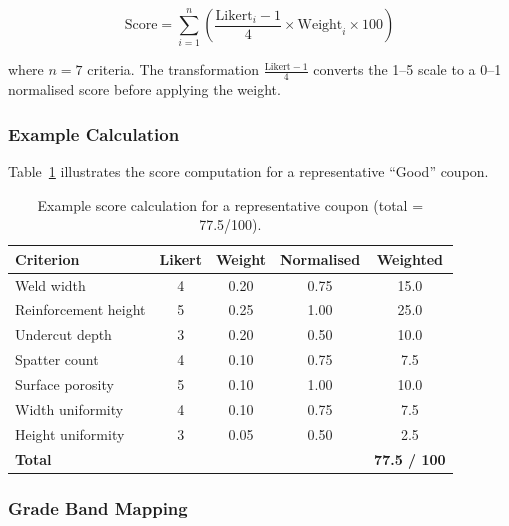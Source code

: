 \documentclass[12pt,a4paper]{article}
\begin{document}
\begin{equation}
  \text{Score} = \sum_{i=1}^{n} \left( \frac{\text{Likert}_i - 1}{4} \times \text{Weight}_i \times 100 \right)
  \label{eq:score}
\end{equation}

\noindent where $n = 7$ criteria. The transformation $\frac{\text{Likert} - 1}{4}$ converts the 1--5 scale to
a 0--1 normalised score before applying the weight.

\subsubsection*{Example Calculation}

Table~\ref{tab:example} illustrates the score computation for a representative ``Good'' coupon.

\begin{table}[htbp]
  \centering
  \caption{Example score calculation for a representative coupon (total = 77.5/100).}
  \label{tab:example}
  \begin{tabular}{lcccc}
    \toprule
    \textbf{Criterion} & \textbf{Likert} & \textbf{Weight} & \textbf{Normalised} & \textbf{Weighted} \\
    \midrule
    Weld width            & 4 & 0.20 & 0.75 & 15.0 \\
    Reinforcement height  & 5 & 0.25 & 1.00 & 25.0 \\
    Undercut depth        & 3 & 0.20 & 0.50 & 10.0 \\
    Spatter count         & 4 & 0.10 & 0.75 &  7.5 \\
    Surface porosity      & 5 & 0.10 & 1.00 & 10.0 \\
    Width uniformity      & 4 & 0.10 & 0.75 &  7.5 \\
    Height uniformity     & 3 & 0.05 & 0.50 &  2.5 \\
    \midrule
    \textbf{Total}        &   &      &      & \textbf{77.5 / 100} \\
    \bottomrule
  \end{tabular}
\end{table}

\subsubsection*{Grade Band Mapping}
\end{document}
